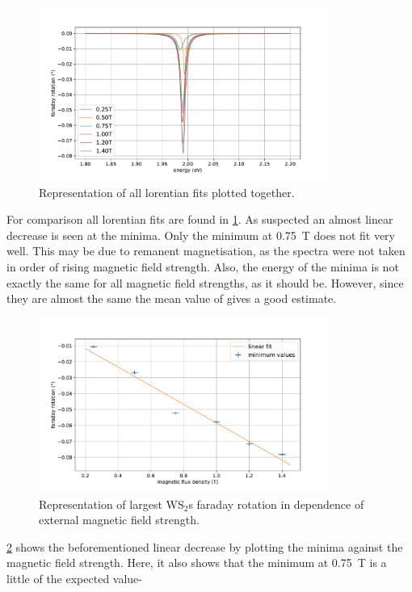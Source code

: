 \begin{figure}[!ht]
    \centering
    \includegraphics[width=0.85\textwidth]{plots/WS2_lorentians.pdf}
    \caption{Representation of all lorentian fits plotted together.}
    \label{fig_WS2_lorentians}
\end{figure}
For comparison all lorentian fits are found in \cref{fig_WS2_lorentians}.
As suspected an almost linear decrease is seen at the minima.
Only the minimum at \SI{0.75}{\tesla} does not fit very well.
This may be due to remanent magnetisation, as the spectra were not taken in order of rising magnetic field strength.
Also, the energy of the minima is not exactly the same for all magnetic field strengths, as it should be.
However, since they are almost the same the mean value of \SI{}{} gives a good estimate. %

\begin{figure}[!ht]
    \centering
    \includegraphics[width=0.85\textwidth]{plots/WS2_mins.pdf}
    \caption{Representation of largest WS$_2$s faraday rotation in dependence of external magnetic field strength.}
    \label{fig_WS2_minima}
\end{figure}
\cref{fig_WS2_minima} shows the beforementioned linear decrease by plotting the minima against the magnetic field strength.
Here, it also shows that the minimum at \SI{0.75}{\tesla} is a little of the expected value-

